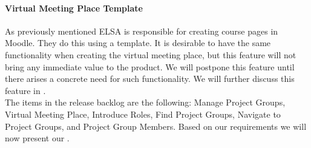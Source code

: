 \paragraph{Virtual Meeting Place Template}
As previously mentioned ELSA is responsible for creating course pages in Moodle. 
They do this using a template. 
It is desirable to have the same functionality when creating the virtual meeting place, but this feature will not bring any immediate value to the product. 
We will postpone this feature until there arises a concrete need for such functionality.
We will further discuss this feature in \secref{}.\\

The items in the release backlog are the following: Manage Project Groups, Virtual Meeting Place, Introduce Roles, Find Project Groups, Navigate to Project Groups, and Project Group Members. 
Based on our requirements we will now present our .


\begin{comment}
In the interview described in \appref{sec:lene} we learned that there is a need for having a concept of project groups in \moodle{}.  to enhance communication by sending messages from the \admpers{} to project groups through \moodle{}.
This evolves into two backlog items; integrate the concept of project groups into \moodle{} and allow the administrative personnel to post messages to the project group.
The former is represented as a backlog item which can be seen in \figref{fig:productbacklog}.
The latter is implemented by the \supervisorgroup{}.
\end{comment}

\FloatBarrier
